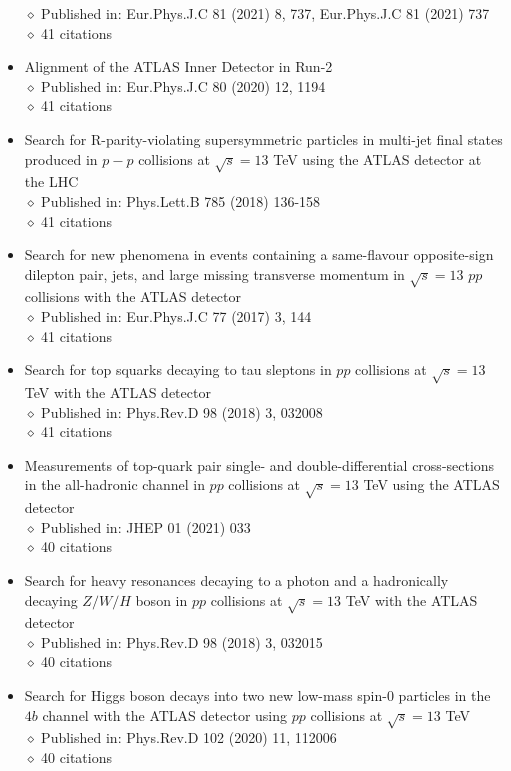 \documentclass[margin, 10pt]{res} %
\begin{document}
\begin{resume}
\begin{itemize}
$\diamond$ Published in: Eur.Phys.J.C 81 (2021) 8, 737, Eur.Phys.J.C 81 (2021) 737\\
$\diamond$ 41 citations
\item Alignment of the ATLAS Inner Detector in Run-2\\
$\diamond$ Published in: Eur.Phys.J.C 80 (2020) 12, 1194\\
$\diamond$ 41 citations
\item Search for R-parity-violating supersymmetric particles in multi-jet final states produced in 
$p-p$ collisions at $\sqrt{s} = 13$ TeV using the ATLAS detector at the LHC\\
$\diamond$ Published in: Phys.Lett.B 785 (2018) 136-158\\
$\diamond$ 41 citations
\item Search for new phenomena in events containing a same-flavour opposite-sign dilepton pair, jets, and large missing transverse momentum in $\sqrt{s} = 13$ $pp$ collisions with the ATLAS detector\\
$\diamond$ Published in: Eur.Phys.J.C 77 (2017) 3, 144\\
$\diamond$ 41 citations
\item Search for top squarks decaying to tau sleptons in $pp$ collisions at $\sqrt{s} = 13$ TeV with the ATLAS detector\\
$\diamond$ Published in: Phys.Rev.D 98 (2018) 3, 032008\\
$\diamond$ 41 citations
\item Measurements of top-quark pair single- and double-differential cross-sections in the all-hadronic channel in $pp$ collisions at $\sqrt{s} = 13$ TeV using the ATLAS detector\\
$\diamond$ Published in: JHEP 01 (2021) 033\\
$\diamond$ 40 citations
\item Search for heavy resonances decaying to a photon and a hadronically decaying $Z/W/H$ boson in $pp$ collisions at $\sqrt{s} = 13$ TeV with the ATLAS detector\\
$\diamond$ Published in: Phys.Rev.D 98 (2018) 3, 032015\\
$\diamond$ 40 citations
\item Search for Higgs boson decays into two new low-mass spin-0 particles in the $4b$ channel with the ATLAS detector using $pp$ collisions at $\sqrt{s} = 13$ TeV\\
$\diamond$ Published in: Phys.Rev.D 102 (2020) 11, 112006\\
$\diamond$ 40 citations

\end{itemize}
\end{resume}
\end{document}
